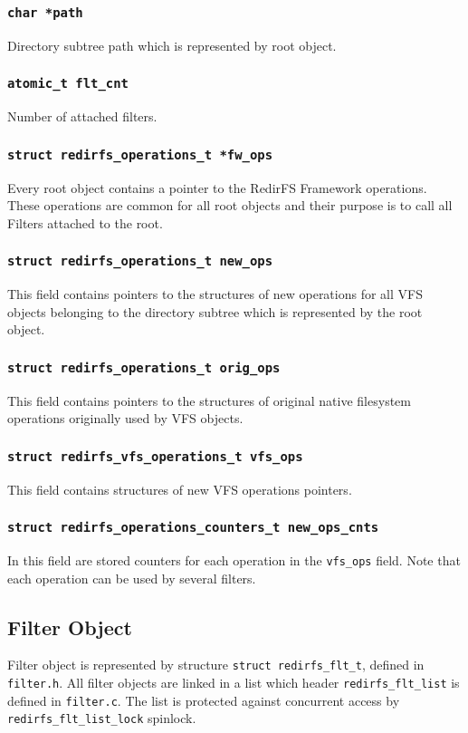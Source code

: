 \subsubsection{\texttt{char *path}}
Directory subtree path which is represented by root object.

\subsubsection{\texttt{atomic\_t flt\_cnt}}
Number of attached filters.

\subsubsection{\texttt{struct redirfs\_operations\_t *fw\_ops}}
Every root object contains a pointer to the RedirFS Framework operations. These
operations are common for all root objects and their purpose is to call all Filters
attached to the root.

\subsubsection{\texttt{struct redirfs\_operations\_t new\_ops}}
This field contains pointers to the structures of new operations for all VFS objects
belonging to the directory subtree which is represented by the root object.

\subsubsection{\texttt{struct redirfs\_operations\_t orig\_ops}}
This field contains pointers to the structures of original native filesystem
operations originally used by VFS objects. 

\subsubsection{\texttt{struct redirfs\_vfs\_operations\_t vfs\_ops}}
This field contains structures of new VFS operations pointers.

\subsubsection{\texttt{struct redirfs\_operations\_counters\_t new\_ops\_cnts}}
In this field are stored counters for each operation in the \texttt{vfs\_ops} field.
Note that each operation can be used by several filters.

\subsection{Filter Object}
Filter object is represented by structure \texttt{struct redirfs\_flt\_t}, defined in
\texttt{filter.h}. All filter objects are linked in a list which header
\texttt{redirfs\_flt\_list} is defined in \texttt{filter.c}. The list is protected against
concurrent access by \texttt{redirfs\_flt\_list\_lock} spinlock.


